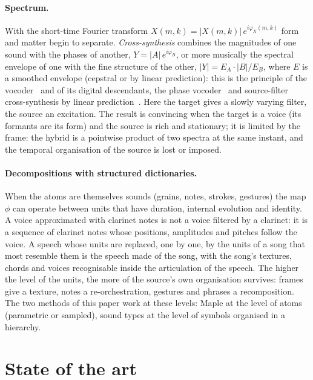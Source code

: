 \documentclass[11pt,a4paper]{article}
\begin{document}
\paragraph{Spectrum.} With the short-time Fourier transform
$X(m, k) = |X(m,k)|\, e^{i \varphi_X(m,k)}$ form and matter begin to separate.
\emph{Cross-synthesis} combines the magnitudes of one sound with the phases
of another, $Y = |A|\, e^{i\varphi_B}$, or more musically the spectral
envelope of one with the fine structure of the other,
$|Y| = E_A \cdot |B| / E_B$, where $E$ is a smoothed envelope (cepstral or
by linear prediction): this is the principle of the vocoder~\cite{dudley1939}
and of its digital descendants, the phase vocoder~\cite{flanagan1966,dolson1986}
and source-filter cross-synthesis by linear prediction~\cite{moorer1979}.
Here the target gives a slowly varying filter, the source an excitation. The
result is convincing when the target is a voice (its formants are its form)
and the source is rich and stationary; it is limited by the frame: the hybrid
is a pointwise product of two spectra at the same instant, and the temporal
organisation of the source is lost or imposed.

\paragraph{Decompositions with structured dictionaries.} When the atoms are
themselves sounds (grains, notes, strokes, gestures) the map
$\phi$ can operate between units that have duration, internal evolution and
identity. A voice approximated with clarinet notes is not a voice filtered by
a clarinet: it is a sequence of clarinet notes whose positions, amplitudes and
pitches follow the voice. A speech whose units are replaced, one by one, by
the units of a song that most resemble them is the speech made of the song,
with the song's textures, chords and voices recognisable inside the
articulation of the speech. The higher the level of the units, the more of
the source's own organisation survives: frames give a texture, notes a
re-orchestration, gestures and phrases a recomposition. The two methods of
this paper work at these levels: Maple at the level of atoms (parametric
or sampled), sound types at the level of symbols organised in a hierarchy.

\section{State of the art}
\end{document}
